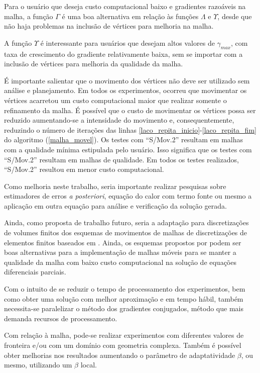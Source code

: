 Para o usuário que deseja custo computacional baixo e gradientes razoáveis na malha, a função $\Gamma$ é uma boa alternativa em relação às funções $\Lambda$ e $\Upsilon$, desde que não haja problemas na inclusão de vértices para melhoria na malha.

A função $\Upsilon$ é interessante para usuários que desejam altos valores de $\gamma_{max}$, com taxa de crescimento do gradiente relativamente baixa, sem se importar com a inclusão de vértices para melhoria da qualidade da malha.

É importante salientar que o movimento dos vértices não deve ser utilizado sem análise e planejamento. Em todos os experimentos, ocorreu que movimentar os vértices acarretou um custo computacional maior que realizar somente o refinamento da malha. É possível que o custo de movimentar os vértices possa ser reduzido aumentando-se a intensidade do movimento e, consequentemente, reduzindo o número de iterações das linhas \ref{laco_repita_inicio}-\ref{laco_repita_fim} do algoritmo (\ref{malha_movel}). Os testes com ``S/Mov.2'' resultam em malhas com a qualidade mínima estipulada pelo usuário. Isso significa que os testes com ``S/Mov.2'' resultam em malhas de qualidade. Em todos os testes realizados, ``S/Mov.2'' resultou em menor custo computacional.

Como melhoria neste trabalho, seria importante realizar pesquisas sobre estimadores de erros {\it a posteriori}, equação do calor com termo fonte ou mesmo a aplicação em outra equação para análise e verificação da solução gerada. 

Ainda, como proposta de trabalho futuro, seria a adaptação para discretizações de volumes finitos dos esquemas de movimentos de malhas de discretizações de elementos finitos baseados em . Ainda, os esquemas propostos por  podem ser boas alternativas para a implementação de malhas móveis para se manter a qualidade da malha com baixo custo computacional na solução de equações diferenciais parciais.

Com o intuito de se reduzir o tempo de processamento dos experimentos, bem como obter uma solução com melhor aproximação e em tempo hábil, também necessita-se paralelizar o método dos gradientes conjugados, método que mais demanda recursos de processamento.

Com relação à malha, pode-se realizar experimentos com diferentes valores de fronteira e/ou com um domínio com geometria complexa. Também é possível obter melhorias nos resultados aumentando o parâmetro de adaptatividade $\beta$, ou mesmo, utilizando um $\beta$ local.